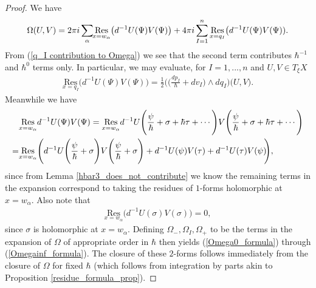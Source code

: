 \documentclass[a4paper,12pt,reqno]{amsart}
\numberwithin{equation}{section}
\numberwithin{counter2}{section}
\begin{document}
\begin{proof}
We have 
\begin{align}
\Omega(U,V) = 2\pi i \sum_{\alpha} \hspace{-1mm} \underset{x=w_\alpha}{\text{Res}} \big(  d^{-1} U(\Psi) V(\Psi)\big) + 4 \pi i \sum_{I = 1}^n  \underset{x=q_I}{\text{Res}}\big( d^{-1}  U(\Psi) V(\Psi)).
\end{align}
From (\ref{q_I contribution to Omega}) we see that the second term contributes $\hbar^{-1}$ and $\hbar^{0}$ terms only.  In particular,  we may evaluate,  for $I = 1,...,n$ and $U,V \in T_\xi X$
\begin{align}
 \underset{x=q_I}{\text{Res}}\big( d^{-1} U(\Psi)  V(\Psi)) = \frac{1}{2}\bigg(\bigg(\frac{dp_I}{\hbar} + {dv_I}\bigg) \wedge dq_I  \bigg) \big(U,V\big). 
\end{align}
Meanwhile we have
\begin{align}
&\underset{x=w_\alpha}{\text{Res}} d^{-1} U(\Psi)  V(\Psi) \nonumber
= \underset{x=w_\alpha}{\text{Res}} d^{-1}U\Bigg(\frac{\psi}{\hbar}+{\sigma}+\hbar\tau + \cdots \Bigg) V\Bigg(\frac{\psi}{\hbar}+{\sigma}+\hbar\tau + \cdots \Bigg) \\
  = &\underset{x=w_\alpha}{\text{Res}} \Bigg( d^{-1}U\Bigg(\frac{\psi}{\hbar}+{\sigma}\Bigg)V\Bigg(\frac{\psi}{\hbar}+{\sigma}\Bigg)  + {d^{-1} U(\psi)  V(\tau) + d^{-1}  U(\tau) V(\psi)} \hspace{-1mm} \Bigg),  
\end{align}
since from Lemma \ref{hbar3_does_not_contribute} we know the remaining terms in the expansion correspond to taking the residues of $1$-forms holomorphic at $x = w_\alpha$.  Also note that 
\begin{align}
 \underset{x=w_\alpha}{\mathrm{Res}} \big( d^{-1} U(\sigma) V(\sigma) \big) = 0,  
\end{align}
since $\sigma$ is holomorphic at $x = w_\alpha$.  Defining $\Omega_{-},\Omega_{I},\Omega_{+}$ to be the terms in the expansion of $\Omega$ of appropriate order in $\hbar$ then yields (\ref{Omega0_formula}) through (\ref{Omegainf_formula}).  The closure of these $2$-forms follows immediately from the closure of $\Omega$ for fixed $\hbar$ (which follows from integration by parts akin to Proposition \ref{residue_formula_prop}).  
\end{proof}
\end{document}
